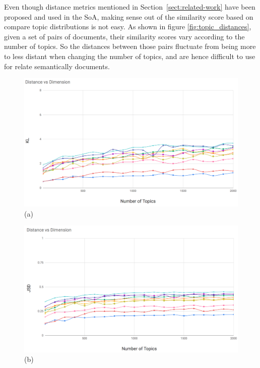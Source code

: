 Even though distance metrics mentioned in Section~\ref{sect:related-work} have been proposed and used in the SoA, making sense out of the similarity score based on compare topic distributions is not easy. As shown in figure \ref{fig:topic_distances}, given a set of pairs of documents, their similarity scores vary according to the number of topics. So the distances between those pairs fluctuate from being more to less distant when changing the number of topics, and are hence difficult to use for relate semantically documents.
\begin{figure}
\begin{center}
\begin{adjustbox}{minipage=0.50\linewidth,frame=0pt 3pt}
\includegraphics[width=\linewidth]{KL_100_2k.png}
\centering (a)
\end{adjustbox}
\hfill
\begin{adjustbox}{minipage=0.50\linewidth,frame=0pt 3pt}
\includegraphics[width=\linewidth]{JSD_100_2k.png}
\centering (b)
\end{adjustbox}
\hfill

\end{center}
\end{figure}
